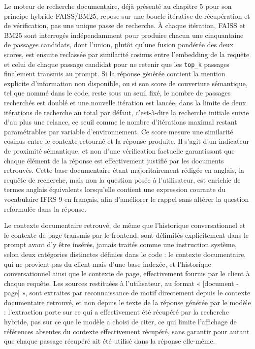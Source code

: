 Le moteur de recherche documentaire, déjà présenté au chapitre 5 pour son principe hybride FAISS/BM25, repose sur une boucle itérative de récupération et de vérification, pas une unique passe de recherche. À chaque itération, FAISS et BM25 sont interrogés indépendamment pour produire chacun une cinquantaine de passages candidats, dont l'union, plutôt qu'une fusion pondérée des deux scores, est ensuite reclassée par similarité cosinus entre l'embedding de la requête et celui de chaque passage candidat pour ne retenir que les \texttt{top\_k} passages finalement transmis au prompt. Si la réponse générée contient la mention explicite d'information non disponible, ou si son score de couverture sémantique, tel que nommé dans le code, reste sous un seuil fixé, le nombre de passages recherchés est doublé et une nouvelle itération est lancée, dans la limite de deux itérations de recherche au total par défaut, c'est-à-dire la recherche initiale suivie d'au plus une relance, ce seuil comme le nombre d'itérations maximal restant paramétrables par variable d'environnement. Ce score mesure une similarité cosinus entre le contexte retourné et la réponse produite. Il s'agit d'un indicateur de proximité sémantique, et non d'une vérification factuelle garantissant que chaque élément de la réponse est effectivement justifié par les documents retrouvés. Cette base documentaire étant majoritairement rédigée en anglais, la requête de recherche, mais non la question posée à l'utilisateur, est enrichie de termes anglais équivalents lorsqu'elle contient une expression courante du vocabulaire IFRS 9 en français, afin d'améliorer le rappel sans altérer la question reformulée dans la réponse.

Le contexte documentaire retrouvé, de même que l'historique conversationnel et le contexte de page transmis par le frontend, sont délimités explicitement dans le prompt avant d'y être insérés, jamais traités comme une instruction système, selon deux catégories distinctes définies dans le code : le contexte documentaire, qui ne provient pas du client mais d'une base indexée, et l'historique conversationnel ainsi que le contexte de page, effectivement fournis par le client à chaque requête. Les sources restituées à l'utilisateur, au format « [document - page] », sont extraites par reconnaissance de motif directement depuis le contexte documentaire retrouvé, et non depuis le texte de la réponse générée par le modèle : l'extraction porte sur ce qui a effectivement été récupéré par la recherche hybride, pas sur ce que le modèle a choisi de citer, ce qui limite l'affichage de références absentes du contexte effectivement récupéré, sans garantir pour autant que chaque passage récupéré ait été utilisé dans la réponse elle-même.


